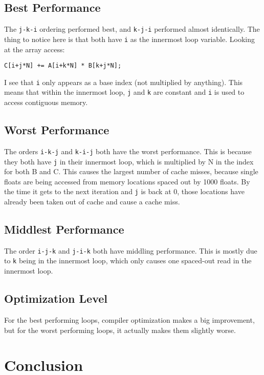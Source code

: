 \documentclass[12pt,letterpaper]{article}
\begin{document}
\subsection*{Best Performance}

The \lstinline{j-k-i} ordering performed best, and \lstinline{k-j-i} performed almost identically.
The thing to notice here is that both have \lstinline{i} as the innermost loop variable. Looking at
the array access:

\lstinline{C[i+j*N] += A[i+k*N] * B[k+j*N];}

I see that \lstinline{i} only appears as a base index (not multiplied by anything). This means that
within the innermost loop, \lstinline{j} and \lstinline{k} are constant and \lstinline{i} is used to
access contiguous memory.

\subsection*{Worst Performance}

The orders \lstinline{i-k-j} and \lstinline{k-i-j} both have the worst performance. This is because
they both have \lstinline{j} in their innermost loop, which is multiplied by N in the index for both
B and C. This causes the largest number of cache misses, because single floats are being accessed
from memory locations spaced out by 1000 floats. By the time it gets to the next iteration and
\lstinline{j} is back at 0, those locations have already been taken out of cache and cause a cache
miss.

\subsection*{Middlest Performance}

The order \lstinline{i-j-k} and \lstinline{j-i-k} both have middling performance. This is mostly due
to \lstinline{k} being in the innermost loop, which only causes one spaced-out read in the innermost
loop.

\subsection*{Optimization Level}

For the best performing loops, compiler optimization makes a big improvement, but for the worst
performing loops, it actually makes them slightly worse. 

\section*{Conclusion}
\end{document}
